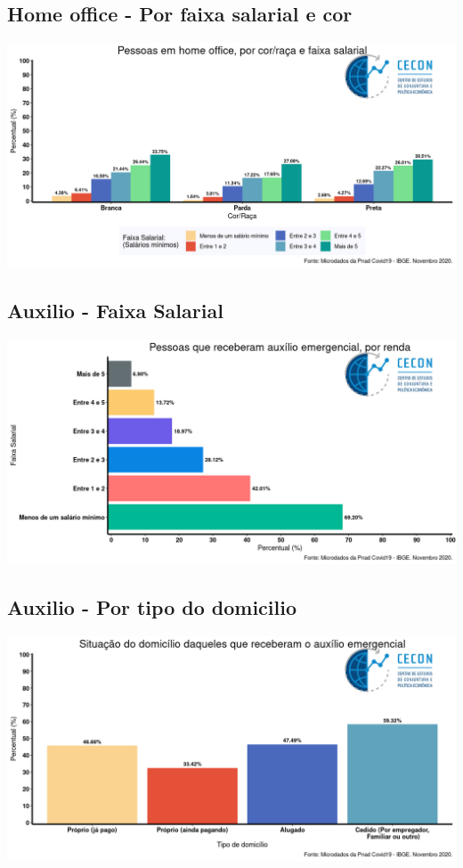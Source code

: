 \documentclass{SelfArx}
\begin{document}
\subsection*{Home office - Por faixa salarial e cor}
\label{sec:org6df2486}
\begin{center}
\includegraphics[width=.9\linewidth]{./figs/PNAD_COVID/home_renda.png}
\end{center}
\subsection*{Auxilio - Faixa Salarial}
\label{sec:org00001e0}
\begin{center}
\includegraphics[width=.9\linewidth]{./figs/PNAD_COVID/auxilio_renda.png}
\end{center}
\subsection*{Auxilio - Por tipo do domicilio}
\label{sec:orgd2bbe59}
\begin{center}
\includegraphics[width=.9\linewidth]{./figs/PNAD_COVID/auxilio_domicilio.png}
\end{center}
\end{document}
